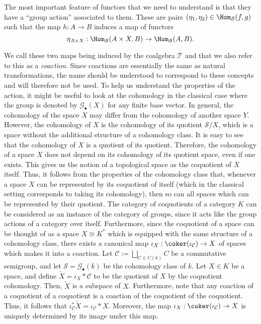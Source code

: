 \documentclass[a4paper,reqno,oneside]{article}
\begin{document}
The most important feature of functors that we need to understand is that they have a ``group action'' associated to them. These are pairs $(\eta_1, \eta_2) \in \Hom_{\mathcal S}(f, g)$ such that the map $h : A \to B$ induces a map of functors
\[
\eta_{A \times X} : \Hom_{\mathcal S}(A \times X, B) \to \Hom_{\mathcal S}(A, B).
\]

We call these two maps being induced by the coalgebra $\mathcal T$ and that we also refer to this as a \textit{coaction}. Since coactions are essentially the same as natural transformations, the name should be understood to correspond to these concepts and will therefore not be used. To help us understand the properties of the action, it might be useful to look at the cohomology in the classical case where the group is denoted by $\mathcal G_\bullet(X)$ for any finite base vector. In general, the cohomology of the space $X$ may differ from the cohomology of another space $Y$. However, the cohomology of $X$ is the cohomology of its quotient $\mathcal S/X$, which is a space without the additional structure of a cohomology class. It is easy to see that the cohomology of $X$ is a quotient of its quotient. Therefore, the cohomology of a space $X$ does not depend on its cohomology of its quotient space, even if one exists. This gives us the notion of a topological space as the coquotient of $X$ itself. Thus, it follows from the properties of the cohomology class that, whenever a space $X$ can be represented by its coquotient of itself (which in the classical setting corresponds to taking its cohomology), then so can all spaces which can be represented by their quotient. The category of coquotients of a category $K$ can be considered as an instance of the category of groups, since it acts like the group actions of a category over itself.
%
Furthermore, since the coquotient of a space can be thought of as a space $X \cong K^*$ which is equipped with the same structure of a cohomology class, there exists a canonical map $\iota_{X} : \coker(\iota_{\mathcal C}) \to X$ of spaces which makes it into a coaction.
%
Let $\mathcal C := \bigsqcup_{C \in C(k)} C$ be a commutative semigroup, and let $\mathcal S = \mathcal G_\bullet(k)$ be the cohomology class of $k$. Let $X \in K$ be a space, and define $\widetilde{X} = \iota_{X} * \mathcal C$ to be the quotient of $X$ by the coquotient cohomology. Then, $\widetilde{X}$ is a subspace of $X$. Furthermore, note that any coaction of a coquotient of a coquotient is a coaction of the coquotient of the coquotient. Thus, it follows that $\iota_{\mathcal C}^* \widetilde{X} = \iota_{\mathcal C} * X$. Moreover, the map $\iota_{X} : \coker(\iota_{\mathcal C}) \to X$ is uniquely determined by its image under this map.
\end{document}
